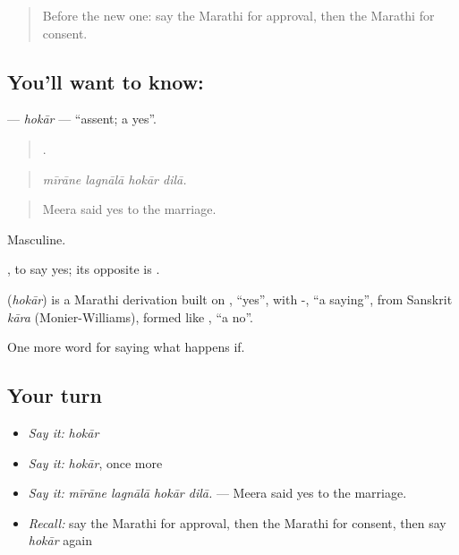 \label{lesson:MR-C543-hokar}



\begin{quote}
Before the new one: say the Marathi for approval, then the Marathi for consent.
\end{quote}

\subsection*{You'll want to know: }
\textbf{} — \emph{hokār} — \textquotedblleft{}assent; a yes\textquotedblright{}.

\begin{quote}
   .
\end{quote}

\begin{quote}
\emph{mīrāne lagnālā hokār dilā.}
\end{quote}

\begin{quote}
Meera said yes to the marriage.
\end{quote}

Masculine.

 , to say yes; its opposite is .

\begin{cousinweb}
\textbf{} (\emph{hokār}) is a Marathi derivation built on , \textquotedblleft{}yes\textquotedblright{}, with -, \textquotedblleft{}a saying\textquotedblright{}, from Sanskrit \emph{kāra} (Monier-Williams), formed like , \textquotedblleft{}a no\textquotedblright{}.
\end{cousinweb}

\begin{grammarlens}[title={What you've built}]
One more word for saying what happens if.
\end{grammarlens}

\subsection*{Your turn}
\begin{itemize}
\raggedright
  \item \emph{Say it:} \emph{hokār}
  \item \emph{Say it:} \emph{hokār}, once more
  \item \emph{Say it:} \emph{mīrāne lagnālā hokār dilā.} — Meera said yes to the marriage.
  \item \emph{Recall:} say the Marathi for approval, then the Marathi for consent, then say \emph{hokār} again
\end{itemize}

